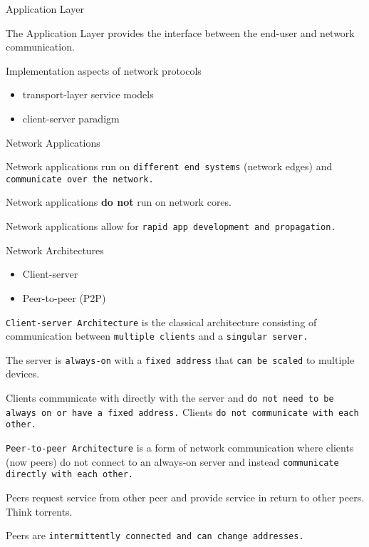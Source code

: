 \begin{topic}{Application Layer}

The Application Layer provides the interface between the end-user and network communication.

Implementation aspects of network protocols
\begin{itemize}
	\item transport-layer service models
	\item client-server paradigm
\end{itemize}

\end{topic}

\begin{topic}{Network Applications}

Network applications run on \texttt{different end systems} (network edges) and \texttt{communicate over the network.}

Network applications \textbf{do not} run on network cores.

Network applications allow for \texttt{rapid app development and propagation.}

\end{topic}

\begin{topic}{Network Architectures}

\begin{itemize}
	\item Client-server
	\item Peer-to-peer (P2P)
\end{itemize}

\begin{subtopic}{2}
\texttt{Client-server Architecture} is the classical architecture consisting of communication between \texttt{multiple clients} and a \texttt{singular server.}

The server is \texttt{always-on} with a \texttt{fixed address} that \texttt{can be scaled} to multiple devices.

Clients communicate with directly with the server and \texttt{do not need to be always on or have a fixed address.} Clients \texttt{do not communicate with each other.}
\end{subtopic}

\begin{subtopic}{3}
\texttt{Peer-to-peer Architecture} is a form of network communication where clients (now peers) do not connect to an always-on server and instead \texttt{communicate directly with each other.}

Peers request service from other peer and provide service in return to other peers. Think torrents.

Peers are \texttt{intermittently connected and can change addresses.}
\end{subtopic}

\end{topic}

